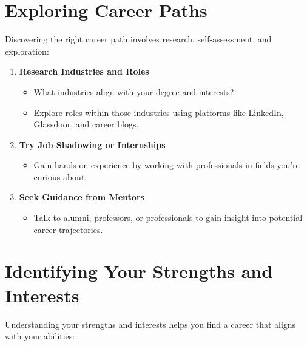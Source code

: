 \documentclass[
  letterpaper,
  DIV=11,
  numbers=noendperiod]{scrreprt}
\providecommand{\tightlist}{%
  \setlength{\itemsep}{0pt}\setlength{\parskip}{0pt}}\usepackage{longtable,booktabs,array}
\begin{document}
\section{Exploring Career Paths}\label{exploring-career-paths}

Discovering the right career path involves research, self-assessment,
and exploration:

\begin{enumerate}
\def\labelenumi{\arabic{enumi}.}
\item
  \textbf{Research Industries and Roles}

  \begin{itemize}
  \tightlist
  \item
    What industries align with your degree and interests?
  \item
    Explore roles within those industries using platforms like LinkedIn,
    Glassdoor, and career blogs.
  \end{itemize}
\item
  \textbf{Try Job Shadowing or Internships}

  \begin{itemize}
  \tightlist
  \item
    Gain hands-on experience by working with professionals in fields
    you're curious about.
  \end{itemize}
\item
  \textbf{Seek Guidance from Mentors}

  \begin{itemize}
  \tightlist
  \item
    Talk to alumni, professors, or professionals to gain insight into
    potential career trajectories.
  \end{itemize}
\end{enumerate}

\section{Identifying Your Strengths and
Interests}\label{identifying-your-strengths-and-interests}

Understanding your strengths and interests helps you find a career that
aligns with your abilities:
\end{document}
